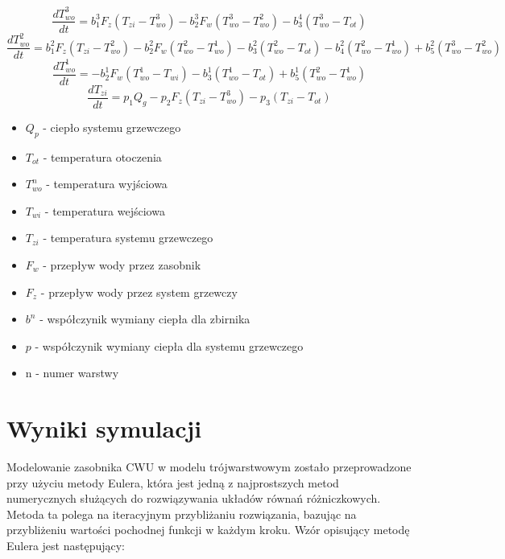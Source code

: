 \documentclass[a4paper,twoside,12pt]{book}
\begin{document}
\begin{equation}
  \frac{dT_{wo}^{3}}{dt} = b_1^3 F_z (T_{zi} - T_{wo}^{3}) - b_2^3 F_w (T_{wo}^{3} - T_{wo}^{2}) - b_3^4 (T_{wo}^{3} - T_{ot})
\end{equation}
\begin{equation}
  \frac{dT_{wo}^{2}}{dt} = b_1^2 F_z (T_{zi} - T_{wo}^{2}) - b_2^2 F_w (T_{wo}^{2} - T_{wo}^{1}) - b_3^2 (T_{wo}^{2} - T_{ot}) - b_4^2 (T_{wo}^{2} - T_{wo}^{1}) + b_5^2 (T_{wo}^{3} - T_{wo}^{2})
\end{equation}
\begin{equation}
  \frac{dT_{wo}^{1}}{dt} = -b_2^1 F_w (T_{wo}^{1} - T_{wi}) - b_3^1 (T_{wo}^{1} - T_{ot}) + b_5^1 (T_{wo}^{2} - T_{wo}^{1})
\end{equation}
\begin{equation}
  \frac{dT_{zi}}{dt} = p_1 Q_g - p_2 F_z (T_{zi} - T_{wo}^{3}) - p_3 (T_{zi} - T_{ot})
\end{equation}

\begin{itemize}
  \item $Q_p$ - ciepło systemu grzewczego
  \item $T_{ot}$ - temperatura otoczenia
  \item $T_{wo}^n$ - temperatura wyjściowa
  \item $T_{wi}$ - temperatura wejściowa
  \item $T_{zi}$ - temperatura systemu grzewczego
  \item $F_{w}$ - przepływ wody przez zasobnik
  \item $F_{z}$ - przepływ wody przez system grzewczy
  \item $b^n$ - współczynik wymiany ciepła dla zbirnika
  \item $p$ - współczynik wymiany ciepła dla systemu grzewczego
  \item n - numer warstwy
\end{itemize}


\newpage
\section{Wyniki symulacji}
Modelowanie zasobnika CWU w modelu trójwarstwowym zostało przeprowadzone przy użyciu metody Eulera, która jest jedną z najprostszych metod numerycznych służących do rozwiązywania układów równań różniczkowych. Metoda ta polega na iteracyjnym przybliżaniu rozwiązania, bazując na przybliżeniu wartości pochodnej funkcji w każdym kroku.
Wzór opisujący metodę Eulera jest następujący:
\end{document}
